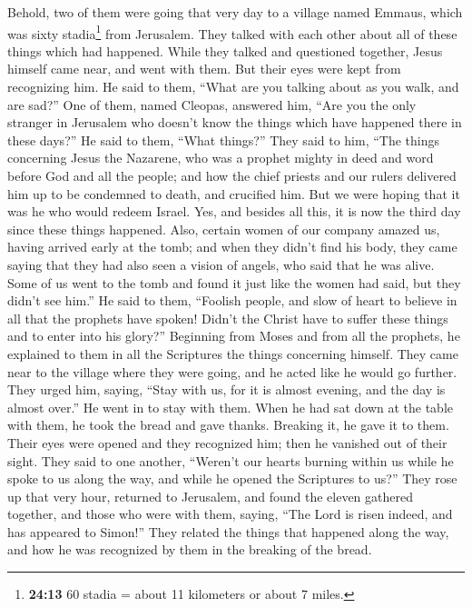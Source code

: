  Behold, two of them were going that very day to a
village named Emmaus, which was sixty stadia\footnote{\textbf{24:13} 60
  stadia = about 11 kilometers or about 7 miles.} from Jerusalem.
 They talked with each other about all of these things
which had happened.  While they talked and questioned
together, Jesus himself came near, and went with them. 
But their eyes were kept from recognizing him.  He said
to them, ``What are you talking about as you walk, and are sad?''
 One of them, named Cleopas, answered him, ``Are you the
only stranger in Jerusalem who doesn't know the things which have
happened there in these days?''  He said to them, ``What
things?'' They said to him, ``The things concerning Jesus the Nazarene,
who was a prophet mighty in deed and word before God and all the people;
 and how the chief priests and our rulers delivered him
up to be condemned to death, and crucified him.  But we
were hoping that it was he who would redeem Israel. Yes, and besides all
this, it is now the third day since these things happened.
 Also, certain women of our company amazed us, having
arrived early at the tomb;  and when they didn't find his
body, they came saying that they had also seen a vision of angels, who
said that he was alive.  Some of us went to the tomb and
found it just like the women had said, but they didn't see him.''
 He said to them, ``Foolish people, and slow of heart to
believe in all that the prophets have spoken!  Didn't the
Christ have to suffer these things and to enter into his glory?''
 Beginning from Moses and from all the prophets, he
explained to them in all the Scriptures the things concerning himself.
 They came near to the village where they were going, and
he acted like he would go further.  They urged him,
saying, ``Stay with us, for it is almost evening, and the day is almost
over.'' He went in to stay with them.  When he had sat
down at the table with them, he took the bread and gave thanks. Breaking
it, he gave it to them.  Their eyes were opened and they
recognized him; then he vanished out of their sight. 
They said to one another, ``Weren't our hearts burning within us while
he spoke to us along the way, and while he opened the Scriptures to
us?''  They rose up that very hour, returned to
Jerusalem, and found the eleven gathered together, and those who were
with them,  saying, ``The Lord is risen indeed, and has
appeared to Simon!''  They related the things that
happened along the way, and how he was recognized by them in the
breaking of the bread.

